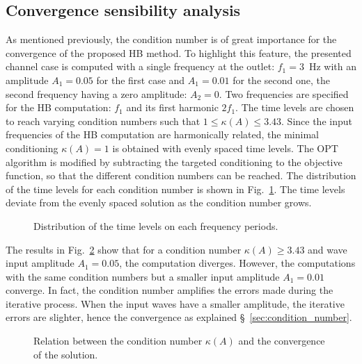 \subsection{Convergence sensibility analysis}

As mentioned previously, the condition number is of great importance
for the convergence of the proposed HB method. To highlight this
feature, the presented channel case is computed with a single
frequency at the outlet: $f_1 = 3$~Hz with an amplitude $A_1 = 0.05$
for the first case and $A_1=0.01$ for the second one, the second
frequency having a zero amplitude: $A_2= 0$.  Two frequencies are
specified for the HB computation: $f_1$ and its first harmonic
$2f_1$. The time levels are chosen to reach varying condition numbers
such that $1 \leq \kappa (A) \leq 3.43$.  Since the input frequencies of the HB
computation are harmonically related, the minimal conditioning
$\kappa(A) = 1$ is obtained with evenly spaced time levels.  The OPT
algorithm is modified by subtracting the targeted conditioning to the
objective function, so that the different condition numbers can be
reached.  The distribution of the time levels for each condition
number is shown in Fig.~\ref{fig:canal2_distribution_tlv}.  The time
levels deviate from the evenly spaced solution as the condition number
grows.
\begin{figure}[htb]
  \centering {}
  \quad {}
  \caption{Distribution of the time levels on each frequency periods.}
  \label{fig:canal2_distribution_tlv}
\end{figure}
The results in Fig.~\ref{fig:canal_residual_vs_conditionning} show that
for a condition number $\kappa (A) \geq 3.43$ and wave input amplitude
$A_1 = 0.05$, the computation diverges. However, the computations with
the same condition numbers but a smaller input amplitude $A_1 = 0.01$
converge. In fact, the condition number amplifies the errors made
during the iterative process. When the input waves have a smaller
amplitude, the iterative errors are slighter, hence the convergence as
explained \S~\ref{sec:condition_number}.
\begin{figure}[htb]
  \centering {}
  \quad
  \caption{Relation between the condition number $\kappa (A)$ and the
    convergence of the solution.}
  \label{fig:canal_residual_vs_conditionning}
\end{figure}


